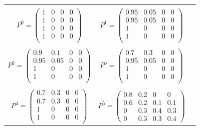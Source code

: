 \documentclass[review,12pt, 3p, times]{elsarticle}
\begin{document}
\begin{table}[htbp] 
	\centering
	\begin{tabular}{ccc}
		& & \\
		$ P^0 = \left( {\begin{array}{cccc}
		1    & 0    & 0   & 0   \\
		1    & 0    & 0   & 0   \\
		1    & 0    & 0   & 0   \\
		1    & 0    & 0   & 0   \\
		\end{array} } \right)$ 
		&
		$P^1 = \left({\begin{array}{cccc}
		0.95 & 0.05 & 0   & 0   \\
		0.95 & 0.05 & 0   & 0   \\
		1    & 0    & 0   & 0   \\
		1    & 0    & 0   & 0   \\
		\end{array} } \right)$  \\
		& \\
		$P^2 = \left( {\begin{array}{cccc}
		0.9  & 0.1  & 0   & 0   \\
		0.95 & 0.05 & 0   & 0   \\
		1    & 0    & 0   & 0   \\
		1    & 0    & 0   & 0   \\
		\end{array} } \right)$ 
		&
		$P^3 = \left( {\begin{array}{cccc}
		0.7  & 0.3  & 0   & 0   \\
		0.95 & 0.05 & 0   & 0   \\
		1    & 0    & 0   & 0   \\
		1    & 0    & 0   & 0   \\
		\end{array} } \right)$ \\
		& \\
		$P^4 = \left( {\begin{array}{cccc}
		0.7  & 0.3  & 0   & 0   \\
		0.7  & 0.3  & 0   & 0   \\
		1    & 0    & 0   & 0   \\
		1    & 0    & 0   & 0   \\
		\end{array} } \right)$ 
		&
		$P^5 = \left( {\begin{array}{cccc}
		0.8  & 0.2  & 0   & 0   \\
		0.6  & 0.2  & 0.1 & 0.1 \\
		0    & 0.3  & 0.4 & 0.3 \\
		0    & 0.3  & 0.3 & 0.4 
		\end{array} } \right)$			
	\end{tabular}\\
	\label{tab:mytable}
\end{table}
\end{document}
